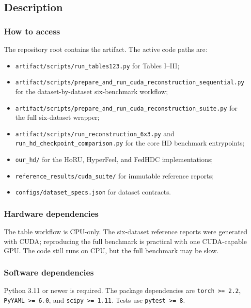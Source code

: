 \documentclass[11pt]{article}
\begin{document}
\subsection{Description}

\subsubsection{How to access}

The repository root contains the artifact. The active code paths are:
\begin{itemize}
  \item \texttt{artifact/scripts/run\_tables123.py} for Tables I--III;
  \item \texttt{artifact/scripts/prepare\_and\_run\_cuda\_reconstruction\_sequential.py}
        for the dataset-by-dataset six-benchmark workflow;
  \item \texttt{artifact/scripts/prepare\_and\_run\_cuda\_reconstruction\_suite.py}
        for the full six-dataset wrapper;
  \item \texttt{artifact/scripts/run\_reconstruction\_6x3.py} and
        \texttt{run\_hd\_checkpoint\_comparison.py} for the core HD benchmark entrypoints;
  \item \texttt{our\_hd/} for the HoRU, HyperFeel, and FedHDC implementations;
  \item \texttt{reference\_results/cuda\_suite/} for immutable
        reference reports;
  \item \texttt{configs/dataset\_specs.json} for dataset contracts.
\end{itemize}

\subsubsection{Hardware dependencies}

The table workflow is CPU-only. The six-dataset reference reports were
generated with CUDA; reproducing the full benchmark is practical with one
CUDA-capable GPU. The code still runs on CPU, but the full benchmark may be
slow.

\subsubsection{Software dependencies}

Python 3.11 or newer is required. The package dependencies are
\texttt{torch >= 2.2}, \texttt{PyYAML >= 6.0}, and \texttt{scipy >= 1.11}.
Tests use \texttt{pytest >= 8}.
\end{document}

